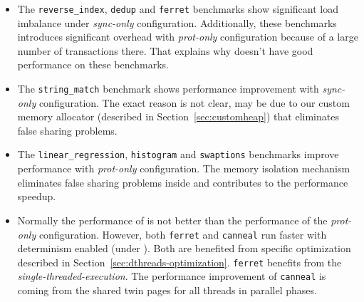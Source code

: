 \begin{itemize}

\item
The \texttt{reverse\_index}, \texttt{dedup} and \texttt{ferret} benchmarks show significant load imbalance under {\it sync-only} configuration. Additionally, these benchmarks introduces significant overhead with {\it prot-only} configuration because of a large number of transactions there. That explains why \dthreads{} doesn't have good performance on these benchmarks.

\item
The \texttt{string\_match} benchmark shows performance improvement with {\it sync-only} configuration. The exact reason is not clear, may be due to our custom memory allocator (described in Section~\ref{sec:customheap}) that eliminates false sharing problems. 

\item
The \texttt{linear\_regression}, \texttt{histogram} and \texttt{swaptions} benchmarks improve performance with {\it prot-only} configuration. The memory isolation mechanism eliminates false sharing problems inside and contributes to the performance speedup.

\item
Normally the performance of \dthreads{} is not better than the performance of the {\it prot-only} configuration. However, both \texttt{ferret} and \texttt{canneal} run faster with determinism enabled (under \dthreads{}). Both are benefited from specific optimization described in Section~\ref{sec:dthreads-optimization}. \texttt{ferret} benefits from the \emph{single-threaded-execution}. The performance improvement of \texttt{canneal} is coming from the shared twin pages for all threads in parallel phases.

\end{itemize}





